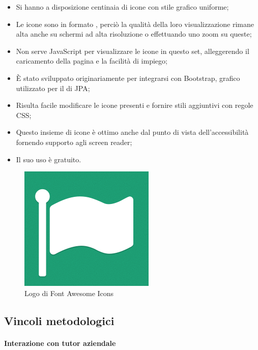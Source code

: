 \begin{itemize}
\item Si hanno a disposizione centinaia di icone con stile grafico uniforme;
\item Le icone sono in formato , perciò la qualità della loro
  visualizzazione rimane alta anche su schermi ad alta risoluzione o
  effettuando uno zoom su queste;
\item Non serve JavaScript per visualizzare le icone in questo set,
  alleggerendo il caricamento della pagina e la facilità di impiego;
\item È stato sviluppato originariamente per integrarsi con Bootstrap,
   grafico utilizzato per il \FREND{} di JPA;
\item Risulta facile modificare le icone presenti e fornire stili aggiuntivi
  con regole CSS;
\item Questo insieme di icone è ottimo anche dal punto di vista
  dell'accessibilità fornendo supporto agli screen reader;
\item Il suo uso è gratuito.
\end{itemize}

\begin{figure}[H]%
\centering
\includegraphics[width=.5\columnwidth]{immagini/logo-fa}
\caption{Logo di Font Awesome Icons}%
\label{fig:logo-fa}%
\end{figure}

\subsection{Vincoli metodologici}

\paragraph{Interazione con tutor aziendale} \mbox{}

